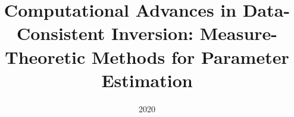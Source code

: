 \documentclass[english,10pt]{ucdenver-dissertation}
\title{Computational Advances in Data-Consistent Inversion: Measure-Theoretic Methods for Parameter Estimation}
\date{2020}
\begin{document}


\pagebreak
\FloatBarrier

% 


\pagebreak
\FloatBarrier


\pagebreak
\FloatBarrier


\pagebreak
\FloatBarrier


\pagebreak
\FloatBarrier
\renewcommand\bibname{REFERENCES}
\singlespacing




\doublespacing

\ucdappendix

%

% 


% 


\end{document}
